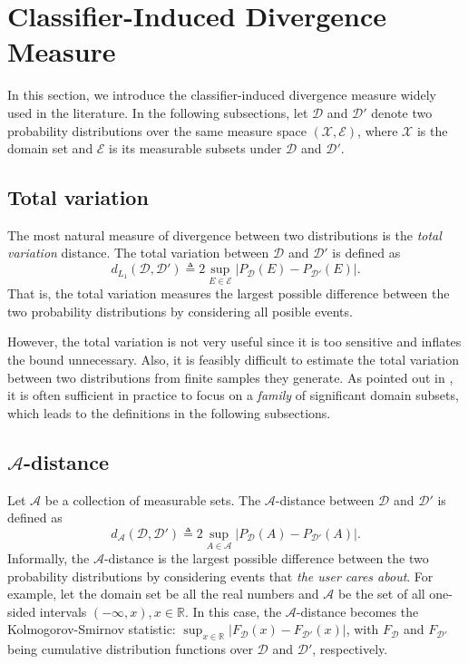 \section{Classifier-Induced Divergence Measure}
In this section, we introduce the classifier-induced divergence measure widely used in the literature. In the following subsections, let $\mathcal{D}$ and $\mathcal{D}'$ denote two probability distributions over the same measure space $(\mathcal{X}, \mathcal{E})$, where $\mathcal{X}$ is the domain set and $\mathcal{E}$ is its measurable subsets under $\mathcal{D}$ and $\mathcal{D}'$.

\subsection{Total variation}
The most natural measure of divergence between two distributions is the \textit{total variation} distance. The total variation between $\mathcal{D}$ and $\mathcal{D}'$ is defined as
\begin{equation}\label{eq:total_var}
  d_{L_1}(\mathcal{D}, \mathcal{D}') \triangleq 2\sup_{E \in \mathcal{E}} \vert P_{\mathcal{D}}(E)-P_{\mathcal{D}'}(E) \vert.
\end{equation}
That is, the total variation measures the largest possible difference between the two probability distributions by considering all posible events.

However, the total variation is not very useful since it is too sensitive and inflates the bound unnecessary. Also, it is feasibly difficult to estimate the total variation between two distributions from finite samples they generate. As pointed out in \cite{Kifer2004}, it is often sufficient in practice to focus on a \textit{family} of significant domain subsets, which leads to the definitions in the following subsections.

\subsection{$\mathcal{A}$-distance}
Let $\mathcal{A}$ be a collection of measurable sets. The $\mathcal{A}$-distance between $\mathcal{D}$ and $\mathcal{D}'$ is defined as
\begin{equation}\label{eq:a_distance}
  d_{\mathcal{A}}(\mathcal{D}, \mathcal{D}') \triangleq 2\sup_{A \in \mathcal{A}} \vert P_{\mathcal{D}}(A)-P_{\mathcal{D}'}(A) \vert.
\end{equation}
Informally, the $\mathcal{A}$-distance is the largest possible difference between the two probability distributions by considering events that \textit{the user cares about}. For example, let the domain set be all the real numbers and $\mathcal{A}$ be the set of all one-sided intervals $(-\infty,x), x \in \mathbb{R}$. In this case, the $\mathcal{A}$-distance becomes the Kolmogorov-Smirnov statistic: $\sup_{x \in \mathbb{R}} \vert F_{\mathcal{D}}(x)-F_{\mathcal{D}'}(x) \vert$, with $F_{\mathcal{D}}$ and $F_{\mathcal{D'}}$ being cumulative distribution functions over $\mathcal{D}$ and $\mathcal{D}'$, respectively.

